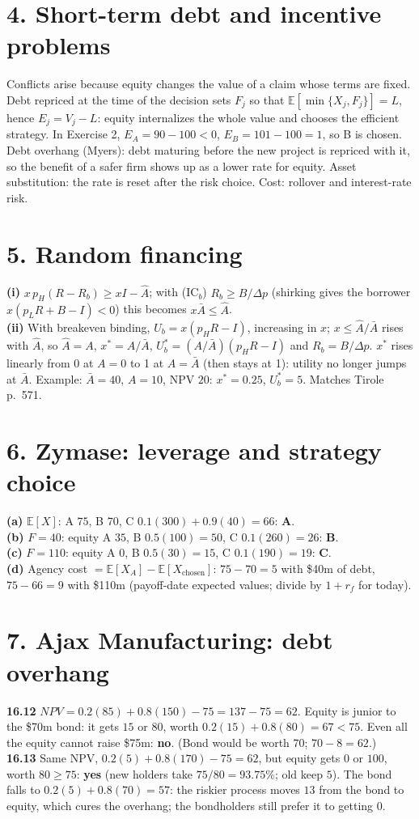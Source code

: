 \documentclass[11pt,a4paper]{article}
\begin{document}
\section*{4. Short-term debt and incentive problems}
Conflicts arise because equity changes the value of a claim whose terms are fixed. Debt repriced
at the time of the decision sets $F_j$ so that $\mathbb{E}[\min\{X_j,F_j\}]=L$, hence $E_j=V_j-L$:
equity internalizes the whole value and chooses the efficient strategy. In Exercise 2,
$E_A=90-100<0$, $E_B=101-100=1$, so B is chosen. Debt overhang (Myers): debt maturing before the
new project is repriced with it, so the benefit of a safer firm shows up as a lower rate for equity.
Asset substitution: the rate is reset after the risk choice. Cost: rollover and interest-rate risk.

\section*{5. Random financing}
\textbf{(i)} $x\,p_H(R-R_b)\ge xI-\hat A$; with (IC$_b$) $R_b\ge B/\Delta p$ (shirking gives the
borrower $x(p_LR+B-I)<0$) this becomes $x\bar A\le\hat A$.\\
\textbf{(ii)} With breakeven binding, $U_b=x(p_HR-I)$, increasing in $x$; $x\le\hat A/\bar A$
rises with $\hat A$, so $\hat A=A$, $x^*=A/\bar A$, $U_b^*=(A/\bar A)(p_HR-I)$ and $R_b=B/\Delta p$.
$x^*$ rises linearly from 0 at $A=0$ to 1 at $A=\bar A$ (then stays at 1): utility no longer
jumps at $\bar A$. Example: $\bar A=40$, $A=10$, NPV $20$: $x^*=0.25$, $U_b^*=5$. Matches Tirole
p.~571.

\section*{6. Zymase: leverage and strategy choice}
\textbf{(a)} $\mathbb{E}[X]$: A $75$, B $70$, C $0.1(300)+0.9(40)=66$: \textbf{A}.\\
\textbf{(b)} $F=40$: equity A $35$, B $0.5(100)=50$, C $0.1(260)=26$: \textbf{B}.\\
\textbf{(c)} $F=110$: equity A $0$, B $0.5(30)=15$, C $0.1(190)=19$: \textbf{C}.\\
\textbf{(d)} Agency cost $=\mathbb{E}[X_A]-\mathbb{E}[X_{\text{chosen}}]$: $75-70=5$ with \$40m of
debt, $75-66=9$ with \$110m (payoff-date expected values; divide by $1+r_f$ for today).

\section*{7. Ajax Manufacturing: debt overhang}
\textbf{16.12} $\mathit{NPV}=0.2(85)+0.8(150)-75=137-75=62$. Equity is junior to the \$70m bond:
it gets $15$ or $80$, worth $0.2(15)+0.8(80)=67<75$. Even all the equity cannot raise \$75m:
\textbf{no}. (Bond would be worth $70$; $70-8=62$.)\\
\textbf{16.13} Same NPV, $0.2(5)+0.8(170)-75=62$, but equity gets $0$ or $100$, worth $80\ge75$:
\textbf{yes} (new holders take $75/80=93.75\%$; old keep $5$). The bond falls to
$0.2(5)+0.8(70)=57$: the riskier process moves $13$ from the bond to equity, which cures the
overhang; the bondholders still prefer it to getting $0$.
\end{document}
